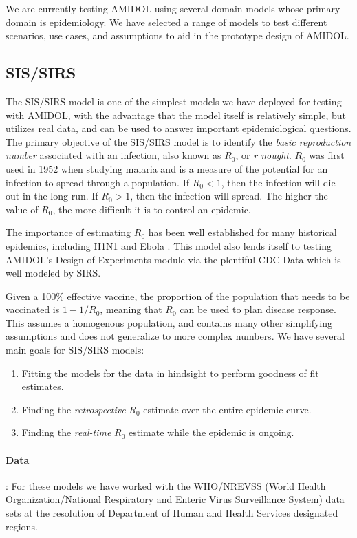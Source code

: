 \documentclass[11pt]{article}
\newcommand{\amidol}{\textsc{AMIDOL}}
\begin{document}
We are currently testing \amidol{} using several domain models whose primary domain is epidemiology.  We have selected a range of models to test different scenarios, use cases, and assumptions to aid in the prototype design of \amidol{}.

\subsection{SIS/SIRS}

The SIS/SIRS model is one of the simplest models we have deployed for testing with \amidol{}, with the advantage that the model itself is relatively simple, but utilizes real data, and can be used to answer important epidemiological questions.  The primary objective of the SIS/SIRS model is to identify the \emph{basic reproduction number} associated with an infection, also known as $R_0$, or \emph{r nought}.  $R_0$ was first used in 1952 when studying malaria and is a measure of the potential for an infection to spread through a population.  If $R_0 < 1$, then the infection will die out in the long run.  If $R_0 > 1$, then the infection will spread.  The higher the value of $R_0$, the more difficult it is to control an epidemic.

The importance of estimating $R_0$ has been well established for many historical epidemics, including H1N1 \cite{fraser2009pandemic} and Ebola \cite{fisman2014early}.  This model also lends itself to testing \amidol{}'s Design of Experiments module via the plentiful CDC Data \cite{cdc2019fluview} which is well modeled by SIRS.

Given a 100\% effective vaccine, the proportion of the population that needs to be vaccinated is $1 - 1/R_0$, meaning that $R_0$ can be used to plan disease response.  This assumes a homogenous population, and contains many other simplifying assumptions and does not generalize to more complex numbers.  We have several main goals for SIS/SIRS models:

\begin{enumerate}
\item Fitting the models for the data in hindsight to perform goodness of fit estimates.
\item Finding the \emph{retrospective} $R_0$ estimate over the entire epidemic curve.
\item Finding the \emph{real-time} $R_0$ estimate while the epidemic is ongoing.
\end{enumerate}

\paragraph{Data}: For these models we have worked with the WHO/NREVSS (World Health Organization/National Respiratory and Enteric Virus Surveillance System) data sets at the resolution of Department of Human and Health Services designated regions.
\end{document}
